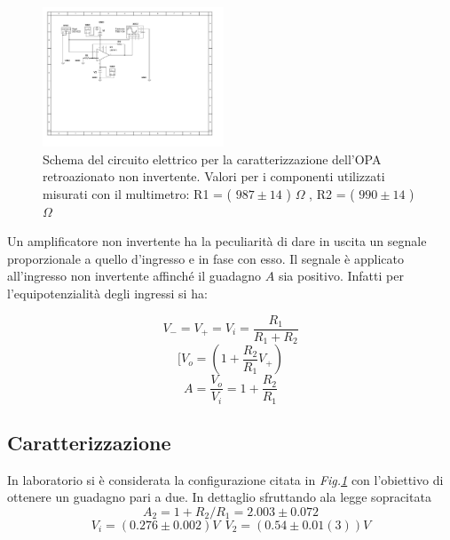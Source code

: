 \documentclass[journal]{IEEEtran}
\begin{document}
\begin{figure}[H]%
\begin {center}
\includegraphics[width=0.48\textwidth]{sch-simulations/output/OPA-closed-loop-non-inverting.pdf}
\caption{Schema del circuito elettrico per la caratterizzazione dell'OPA retroazionato non invertente. Valori per i componenti utilizzati misurati con il multimetro: R1 = ( $987 \pm 14$ ) $\Omega$ , R2 = ( $990 \pm 14$ ) $\Omega$
\\}
\label{fig:loop-non-inv}
\end {center}
\end{figure}

Un amplificatore non invertente ha la peculiarità di dare in uscita un segnale proporzionale a quello d'ingresso e in fase con esso. Il segnale è applicato all'ingresso non invertente affinché il guadagno $A$ sia positivo. Infatti per l'equipotenzialità degli ingressi si ha: 

\vspace{-3mm}

\begin{equation}
    V_{-} = V_{+} = V_{i} = \frac{R_1}{R_1+R_2}
\end{equation}
\begin{equation}
    [V_{o}=(1+\frac{R_2}{R_1}V_{+})
\end{equation}
\begin{equation}
    A=\frac{V_{o}}{V_i}=1+\frac{R_2}{R_1}
\end{equation}
\vspace{-7mm}

\newpage
\subsection{\textbf{Caratterizzazione}}

In laboratorio si è considerata la configurazione citata in \textit{Fig.\ref{fig:loop-non-inv}} con l'obiettivo di ottenere un guadagno pari a due. In dettaglio sfruttando ala legge sopracitata
\[A_2 = 1 + R_2/R_1 = 2.003 \pm 0.072\]
\[V_i = (0.276 \pm 0.002) V \: \: V_2 = (0.54 \pm 0.01(3)) V\]
\end{document}
